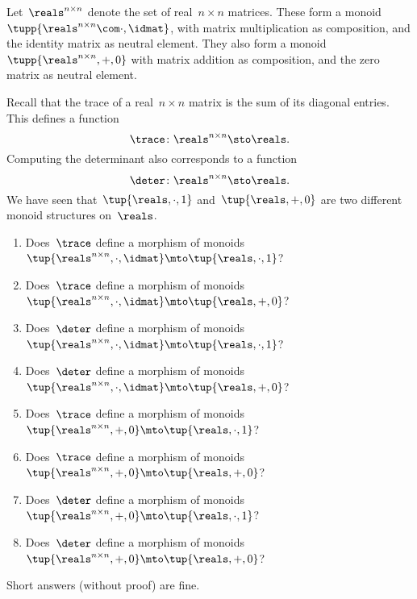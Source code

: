 \begin{gradedexercise}
    \label{ex:TraceAndDeterminant}
    Let~$\reals^{n \times n}$ denote the set of real~$n \times n$ matrices.
    These form a monoid~$\tupp{\reals^{n \times n}\com \cdot, \idmat}$, with matrix multiplication as composition, and the identity matrix as neutral element.
    They also form a monoid $\tupp{\reals^{n \times n}, + , 0}$ with matrix addition as composition, and the zero matrix as neutral element.

    Recall that the trace of a real~$n \times n$ matrix is the sum of its diagonal entries.
    This defines a function
    \begin{equation}
        \trace \colon \reals^{n \times n} \sto \reals.
    \end{equation}
    Computing the determinant also corresponds to a function
    \begin{equation}
        \deter \colon \reals^{n \times n} \sto \reals.
    \end{equation}
    We have seen that~$\tup{ \reals, \cdot, 1}$ and~$\tup{ \reals, +, 0}$ are two different monoid structures on~$\reals$.
    \begin{enumerate}
        \item Does~$\trace$ define a morphism of monoids~$\tup{\reals^{n \times n}, \cdot, \idmat} \mto \tup{ \reals, \cdot, 1}$?
        \item Does~$\trace$ define a morphism of monoids~$\tup{\reals^{n \times n}, \cdot, \idmat} \mto \tup{ \reals, + , 0}$?
        \item Does~$\deter$ define a morphism of monoids~$\tup{\reals^{n \times n}, \cdot, \idmat} \mto \tup{ \reals, \cdot, 1}$?
        \item Does~$\deter$ define a morphism of monoids~$\tup{\reals^{n \times n}, \cdot, \idmat} \mto \tup{ \reals, + , 0}$?
        \item Does~$\trace$ define a morphism of monoids~$\tup{\reals^{n \times n}, +, 0} \mto \tup{ \reals, \cdot, 1}$?
        \item Does~$\trace$ define a morphism of monoids~$\tup{\reals^{n \times n}, +, 0} \mto \tup{ \reals, + , 0}$?
        \item Does~$\deter$ define a morphism of monoids~$\tup{\reals^{n \times n}, +, 0} \mto \tup{ \reals, \cdot, 1}$?
        \item Does~$\deter$ define a morphism of monoids~$\tup{\reals^{n \times n}, +, 0} \mto \tup{ \reals, + , 0}$?
    \end{enumerate}
    Short answers (without proof) are fine.
\end{gradedexercise}

